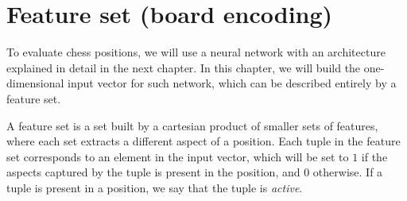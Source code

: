 \newcommand{\white}{\fullmoon}
\newcommand{\black}{\newmoon}

\newcommand{\bigtimes}{\mathop{\raisebox{-0.5ex}{\scalebox{2}{$\times$}}}}

\newcommand{\pieceBoard}{
    \newcount\pieceindex
    \setcounter{pieceindex}{0}
    \raisebox{-7ex}{
        \centering
        \chessboard[
            tinyboard,
            showmover=false,
            margin=false,
            padding=false,
            hlabel=false,
            vlabel=false,
            pgfstyle={text},
            text=\fontsize{1.2ex}{1.2ex}\bfseries\sffamily \currentwq,
            markboard
        ]
    }
}
\newcommand{\pieceRolesTable}{
    \begin{tabular}{|l|}
        \hline
        \sympawn\ Pawn \\
        \hline
        \symknight\ Knight \\
        \hline
        \symbishop\ Bishop \\
        \hline
        \symrook\ Rook \\
        \hline
        \symqueen\ Queen \\
        \hline
        \symking\ King \\
        \hline
    \end{tabular}
}
\newcommand{\pieceColorsTable}{
    \begin{tabular}{|l|}
        \hline
        $\white$ White \\
        \hline
        $\black$ Black \\
        \hline
    \end{tabular}
}

\newcommand{\featureset}[1]{\textsc{#1}}


\section{Feature set (board encoding)}

To evaluate chess positions, we will use a neural network with an architecture explained in detail in the next chapter. In this chapter, we will build the one-dimensional input vector for such network, which can be described entirely by a feature set.

A feature set is a set built by a cartesian product of smaller sets of features, where each set extracts a different aspect of a position. Each tuple in the feature set corresponds to an element in the input vector, which will be set to $1$ if the aspects captured by the tuple is present in the position, and $0$ otherwise. If a tuple is present in a position, we say that the tuple is \textit{active}.

